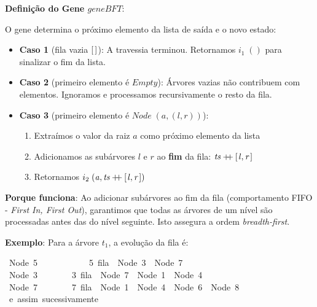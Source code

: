 \documentclass[11pt, a4paper, fleqn]{article}
\newcommand{\Conid}[1]{\mathit{#1}}
\newcommand{\Varid}[1]{\mathit{#1}}
\begin{document}
\textbf{Definição do Gene \ensuremath{\Varid{geneBFT}}}:

O gene determina o próximo elemento da lista de saída e o novo estado:

\begin{itemize} 

\item \textbf{Caso 1} (fila vazia \ensuremath{[\mskip1.5mu \mskip1.5mu]}): A travessia terminou. Retornamos \ensuremath{i_1\;()} para sinalizar o fim da lista.

\item \textbf{Caso 2} (primeiro elemento é \ensuremath{\Conid{Empty}}): Árvores vazias não contribuem com elementos. Ignoramos e processamos recursivamente o resto da fila.

\item \textbf{Caso 3} (primeiro elemento é \ensuremath{\Conid{Node}\;(\Varid{a},(\Varid{l},\Varid{r}))}): 
  \begin{enumerate}
    \item Extraímos o valor da raiz \ensuremath{\Varid{a}} como próximo elemento da lista
    \item Adicionamos as subárvores \ensuremath{\Varid{l}} e \ensuremath{\Varid{r}} ao \textbf{fim} da fila: \ensuremath{\Varid{ts}\mathbin{+\!\!+}[\mskip1.5mu \Varid{l},\Varid{r}\mskip1.5mu]}
    \item Retornamos \ensuremath{i_2\;(\Varid{a},\Varid{ts}\mathbin{+\!\!+}[\mskip1.5mu \Varid{l},\Varid{r}\mskip1.5mu])}
  \end{enumerate}

\end{itemize}

\textbf{Porque funciona}: Ao adicionar subárvores ao fim da fila (comportamento FIFO - \emph{First In, First Out}), garantimos que todas as árvores de um nível são processadas antes das do nível seguinte. Isto assegura a ordem \emph{breadth-first}.

\textbf{Exemplo}: Para a árvore \ensuremath{t_1 }, a evolução da fila é:
\begin{tabbing}\ttfamily
~Node~5~~~~~~~~~~~~5~fila~~Node~3~~Node~7~\\
\ttfamily ~Node~3~~~~~~~~3~fila~~Node~7~~Node~1~~Node~4~\\
\ttfamily ~Node~7~~~~~~~~7~fila~~Node~1~~Node~4~~Node~6~~Node~8~\\
\ttfamily ~e~assim~sucessivamente
\end{tabbing}
\end{document}
